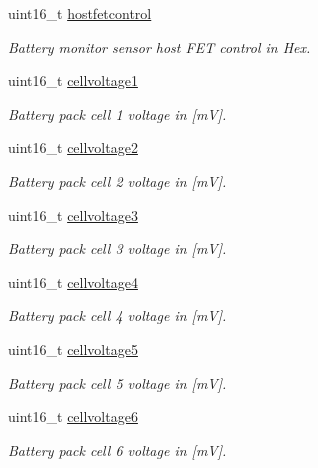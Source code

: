 \begin{DoxyCompactItemize}
uint16\+\_\+t \hyperlink{struct____mavlink__sens__batmon__t_a8e1a887877d62eaec12fe80c0c84a677}{hostfetcontrol}
\begin{DoxyCompactList}\small\item\em Battery monitor sensor host F\+E\+T control in Hex. \end{DoxyCompactList}\item 
uint16\+\_\+t \hyperlink{struct____mavlink__sens__batmon__t_abad383573c8ee5f7780bb7b4cee48238}{cellvoltage1}
\begin{DoxyCompactList}\small\item\em Battery pack cell 1 voltage in \mbox{[}m\+V\mbox{]}. \end{DoxyCompactList}\item 
uint16\+\_\+t \hyperlink{struct____mavlink__sens__batmon__t_a18041d9a8ed07319506f8d55f1491692}{cellvoltage2}
\begin{DoxyCompactList}\small\item\em Battery pack cell 2 voltage in \mbox{[}m\+V\mbox{]}. \end{DoxyCompactList}\item 
uint16\+\_\+t \hyperlink{struct____mavlink__sens__batmon__t_a85a90d69ef2495c0be4006c86ffaa218}{cellvoltage3}
\begin{DoxyCompactList}\small\item\em Battery pack cell 3 voltage in \mbox{[}m\+V\mbox{]}. \end{DoxyCompactList}\item 
uint16\+\_\+t \hyperlink{struct____mavlink__sens__batmon__t_acb82f44139d405d9cdb1e2c7d8e627bc}{cellvoltage4}
\begin{DoxyCompactList}\small\item\em Battery pack cell 4 voltage in \mbox{[}m\+V\mbox{]}. \end{DoxyCompactList}\item 
uint16\+\_\+t \hyperlink{struct____mavlink__sens__batmon__t_aa03d349529f6898565436e6ffa9e640f}{cellvoltage5}
\begin{DoxyCompactList}\small\item\em Battery pack cell 5 voltage in \mbox{[}m\+V\mbox{]}. \end{DoxyCompactList}\item 
uint16\+\_\+t \hyperlink{struct____mavlink__sens__batmon__t_a8f64c9f8a004fea5d08199099da172e6}{cellvoltage6}
\begin{DoxyCompactList}\small\item\em Battery pack cell 6 voltage in \mbox{[}m\+V\mbox{]}. \end{DoxyCompactList}\end{DoxyCompactItemize}


